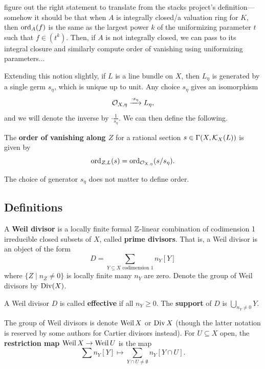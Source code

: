 \documentclass[12pt]{article}
\begin{document}
\begin{prop}
    {\color{red} figure out the right statement to translate from the stacks project's definition---somehow it should be that when $A$ is integrally closed/a valuation ring for $K$, then $\operatorname{ord}_A(f)$ is the same as the largest power $k$ of the uniformizing parameter $t$ such that $f\in (t^k)$. Then, if $A$ is not integrally closed, we can pass to its integral closure and similarly compute order of vanishing using uniformizing parameters...}
\end{prop}

Extending this notion slightly, if $L$ is a line bundle on $X$, then $L_{\eta}$ is generated by a single germ $s_\eta$, which is unique up to unit. Any choice $s_\eta$ gives an isomorphism
\[\mathcal{O}_{X,\eta} \xrightarrow{\cdot s_\eta} L_\eta,\]
and we will denote the inverse by $\cdot \frac{1}{s_\eta}$. We can then define the following.

\begin{defn}
    The \textbf{order of vanishing along $Z$} for a rational section $s\in \Gamma(X,\mathcal{K}_X(L))$ is given by
    \[\operatorname{ord}_{Z,L}(s) = \operatorname{ord}_{\mathcal{O}_{X,\eta}}(s/s_\eta).\]
\end{defn}

The choice of generator $s_\eta$ does not matter to define order.

\subsection{Definitions}

\begin{defn}
    A \textbf{Weil divisor} is a locally finite formal $\mathbb{Z}$-linear combination of codimension 1 irreducible closed subsets of $X$, called \textbf{prime divisors}. That is, a Weil divisor is an object of the form
    \[D = \sum_{Y\subseteq X \text{ codimension } 1} n_Y[Y]\]
    where $\{Z\mid n_Z\neq 0\}$ is locally finite many $n_Y$ are zero. Denote the group of Weil divisors by $\operatorname{Div}(X)$.

    A Weil divisor $D$ is called \textbf{effective} if all $n_Y\geq 0$. The \textbf{support} of $D$ is $\bigcup_{n_Y\neq 0} Y$.

    The group of Weil divisors is denote $\operatorname{Weil} X$ or $\operatorname{Div} X$ (though the latter notation is reserved by some authors for Cartier divisors instead). For $U\subseteq X$ open, the \textbf{restriction map} $\operatorname{Weil} X \to \operatorname{Weil} U$ is the map
    \[\sum n_Y [Y] \mapsto \sum_{Y\cap U\neq \emptyset} n_Y [Y\cap U].\]
\end{defn}
\end{document}
